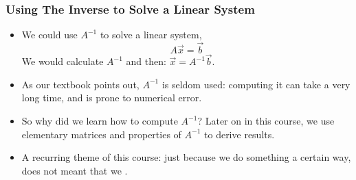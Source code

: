 \begin{frame}\frametitle{Using The Inverse to Solve a Linear System}

    \begin{itemize}
        \item We could use $A^{-1}$ to solve a linear system,  $$A \vec x = \vec b$$ We would calculate $A^{-1}$ and then: $\vec x = A^{-1}\vec b$.
    
        \item As our textbook points out, $A^{-1}$ is seldom used: computing it can take a very long time, and is prone to numerical error.
        \item So why did we learn how to compute $A^{-1}$? Later on in this course, we use elementary matrices and properties of $A^{-1}$ to derive results.
        \item A recurring theme of this course: just because we  do something a certain way, does not meant that we .
    \end{itemize}
\end{frame}


